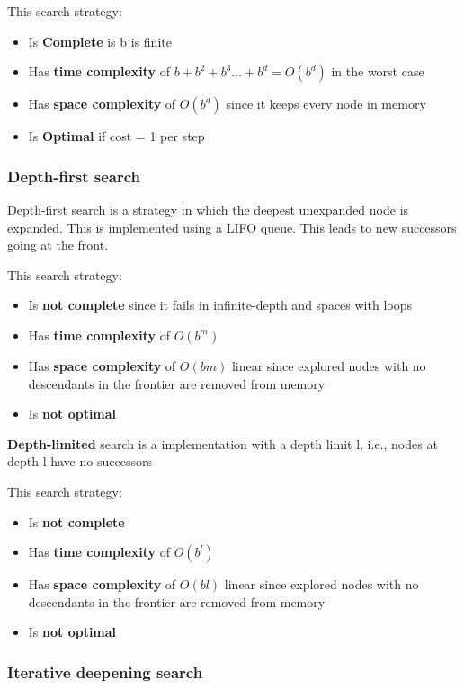 \documentclass{article}
\begin{document}
This search strategy:
\begin{itemize}
    \item Is \textbf{Complete} is b is finite
    \item Has \textbf{time complexity} of $b+b^2+b^3 \ldots +b^d = O(b^d)$ in the worst case
    \item Has \textbf{space complexity} of $O(b^d)$ since it keeps every node in memory
    \item Is \textbf{Optimal} if cost = 1 per step
\end{itemize}

\subsubsection{Depth-first search}

Depth-first search is a strategy in which the deepest unexpanded node is expanded. 
This is implemented using a LIFO queue. This leads to new successors going at the front. 

This search strategy:
\begin{itemize}
    \item Is \textbf{not complete} since it fails in infinite-depth and spaces with loops
    \item Has \textbf{time complexity} of $O(b^m)$ 
    \item Has \textbf{space complexity} of $O(bm)$ linear since explored nodes with no descendants in the frontier are removed from memory
    \item Is \textbf{not optimal}
\end{itemize}

\textbf{Depth-limited} search is a implementation with a depth limit l, i.e., nodes at depth l have no successors

This search strategy:
\begin{itemize}
    \item Is \textbf{not complete} 
    \item Has \textbf{time complexity} of $O(b^l)$ 
    \item Has \textbf{space complexity} of $O(bl)$ linear since explored nodes with no descendants in the frontier are removed from memory
    \item Is \textbf{not optimal}
\end{itemize}

\subsubsection{Iterative deepening search}
\end{document}
